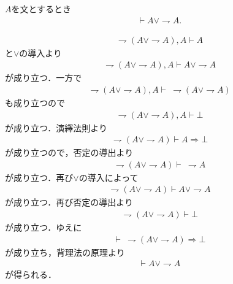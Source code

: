 	\begin{screen}
		\begin{logicalthm}[排中律]\label{logicalthm:law_of_excluded_middle}
			$A$を文とするとき
			\begin{align}
				\vdash A \vee \rightharpoondown A.
			\end{align}
		\end{logicalthm}
	\end{screen}
	
	\begin{prf}
		\begin{align}
			\rightharpoondown (A \vee \rightharpoondown A), A \vdash A
		\end{align}
		と$\vee$の導入より
		\begin{align}
			\rightharpoondown (A \vee \rightharpoondown A), A \vdash A \vee \rightharpoondown A
		\end{align}
		が成り立つ．一方で
		\begin{align}
			\rightharpoondown (A \vee \rightharpoondown A), A \vdash\ \rightharpoondown (A \vee \rightharpoondown A)
		\end{align}
		も成り立つので
		\begin{align}
			\rightharpoondown (A \vee \rightharpoondown A), A \vdash \bot
		\end{align}
		が成り立つ．演繹法則より
		\begin{align}
			\rightharpoondown (A \vee \rightharpoondown A) \vdash A \Longrightarrow \bot
		\end{align}
		が成り立つので，否定の導出より
		\begin{align}
			\rightharpoondown (A \vee \rightharpoondown A) \vdash\ \rightharpoondown A
		\end{align}
		が成り立つ．再び$\vee$の導入によって
		\begin{align}
			\rightharpoondown (A \vee \rightharpoondown A) \vdash A \vee \rightharpoondown A
		\end{align}
		が成り立つ．再び否定の導出より
		\begin{align}
			\rightharpoondown (A \vee \rightharpoondown A) \vdash \bot
		\end{align}
		が成り立つ．ゆえに
		\begin{align}
			\vdash\ \rightharpoondown (A \vee \rightharpoondown A) \Longrightarrow \bot
		\end{align}
		が成り立ち，背理法の原理より
		\begin{align}
			\vdash A \vee \rightharpoondown A
		\end{align}
		が得られる．
		\QED
	\end{prf}
	
